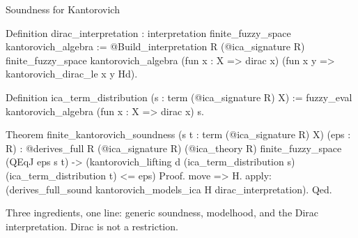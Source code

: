 \documentclass[10pt,aspectratio=169]{beamer}
\begin{document}

                \begin{frame}[fragile]{Soundness for Kantorovich}
                    \begin{srcbox}
Definition dirac_interpretation :
    interpretation finite_fuzzy_space kantorovich_algebra :=
  @Build_interpretation R (@ica_signature R)
    finite_fuzzy_space kantorovich_algebra
    (fun x : X => dirac x)
    (fun x y => kantorovich_dirac_le x y Hd).

Definition ica_term_distribution (s : term (@ica_signature R) X) :=
  fuzzy_eval kantorovich_algebra (fun x : X => dirac x) s.

Theorem finite_kantorovich_soundness
    (s t : term (@ica_signature R) X) (eps : R) :
  @derives_full R (@ica_signature R) (@ica_theory R)
    finite_fuzzy_space (QEqJ eps s t) ->
  (kantorovich_lifting d (ica_term_distribution s)
                         (ica_term_distribution t) <= eps)%
Proof.
  move => H.
  apply: (derives_full_sound kantorovich_models_ica H dirac_interpretation).
Qed.
                    \end{srcbox}
                    \vfill
                    Three ingredients, one line: generic
                    soundness, modelhood, and the
                    Dirac interpretation. Dirac is not a
                    restriction.
                \end{frame}
\end{document}
